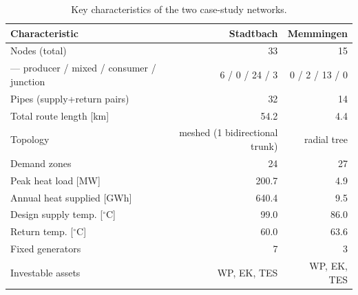 \begin{table}[htbp]
  \centering
  \caption{Key characteristics of the two case-study networks.}
  \label{tab:t1_networks}
  \begin{tabular}{lrr}
  \toprule
  Characteristic & Stadtbach & Memmingen \\
  \midrule
  Nodes (total) & 33 & 15 \\
    — producer / mixed / consumer / junction & 6 / 0 / 24 / 3 & 0 / 2 / 13 / 0 \\
  Pipes (supply+return pairs) & 32 & 14 \\
  Total route length [km] & 54.2 & 4.4 \\
  Topology & meshed (1 bidirectional trunk) & radial tree \\
  Demand zones & 24 & 27 \\
  Peak heat load [MW] & 200.7 & 4.9 \\
  Annual heat supplied [GWh] & 640.4 & 9.5 \\
  Design supply temp. [$^\circ$C] & 99.0 & 86.0 \\
  Return temp. [$^\circ$C] & 60.0 & 63.6 \\
  Fixed generators & 7 & 3 \\
  Investable assets & WP, EK, TES & WP, EK, TES \\
  \bottomrule
  \end{tabular}
\end{table}
